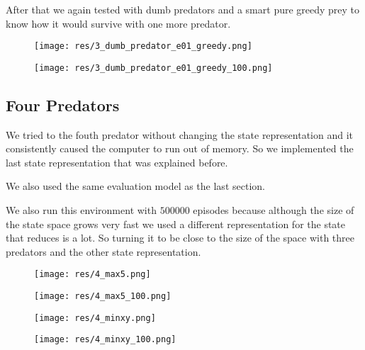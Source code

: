 \documentclass{article}
\begin{document}
After that we again tested with dumb predators and a smart pure greedy prey to
know how it would survive with one more predator.
\begin{figure}[htbp]
	\centering
	\begin{minipage}[t]{.45\linewidth}
		\centering
		\texttt{[image: res/3\_dumb\_predator\_e01\_greedy.png]}
	\end{minipage}
	\begin{minipage}[t]{.45\linewidth}
		\centering
		\texttt{[image: res/3\_dumb\_predator\_e01\_greedy\_100.png]}
	\end{minipage}
\end{figure}

\subsection{Four Predators}
We tried to the fouth predator without changing the state representation and
it consistently caused the computer to run out of memory. So we implemented
the last state representation that was explained before. 

We also used the same evaluation model as the last section.

We also run this environment with $500000$ episodes because although the size of
the state space grows very fast we used a different representation for the
state that reduces is a lot. So turning it to be close to the size of the space
with three predators and the other state representation.

\begin{figure}[htbp]
	\centering
	\begin{minipage}[t]{.45\linewidth}
		\centering
		\texttt{[image: res/4\_max5.png]}
	\end{minipage}
	\begin{minipage}[t]{.45\linewidth}
		\centering
		\texttt{[image: res/4\_max5\_100.png]}
	\end{minipage}
\end{figure}

\begin{figure}[htbp]
	\centering
	\begin{minipage}[t]{.45\linewidth}
		\centering
		\texttt{[image: res/4\_minxy.png]}
	\end{minipage}
	\begin{minipage}[t]{.45\linewidth}
		\centering
		\texttt{[image: res/4\_minxy\_100.png]}
	\end{minipage}
\end{figure}
\end{document}
